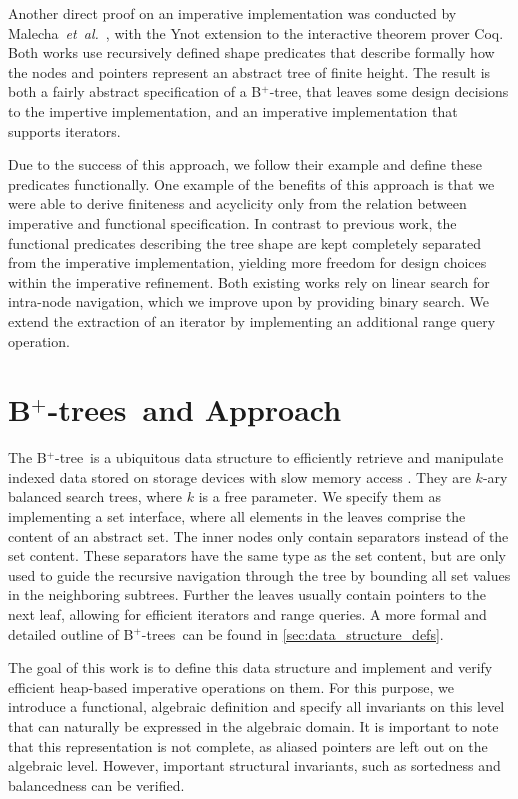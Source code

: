 \documentclass[a4paper,UKenglish,cleveref, cref, thm-restate]{lipics-v2021}
\newcommand{\btree}{B$^+$-tree}
\newcommand{\btrees}{B$^+$-trees}
\begin{document}
Another direct proof on an imperative implementation
was conducted by Malecha~\emph{et~al.}~\cite{DBLP:conf/popl/MalechaMSW10}, with the Ynot
extension to the interactive theorem prover Coq.
Both works use recursively defined shape predicates
that describe formally how the nodes and pointers
represent an abstract tree of finite height.
The result is both a fairly abstract specification of a \btree,
that leaves some design decisions to the impertive implementation,
and an imperative implementation that supports
iterators.

Due to the success of this approach,
we follow their example and define these predicates functionally.
One example of the benefits of this approach is that we were able
to derive finiteness and acyclicity only from the
relation between imperative and functional specification.
In contrast to previous work, the functional predicates describing the tree shape are kept
completely separated from the imperative implementation,
yielding more freedom for design choices within the imperative refinement.
Both existing works rely on linear search for intra-node navigation,
which we improve upon by providing binary search.
We extend the extraction of an iterator
by implementing an additional range query operation. 


\section{\btrees\ and Approach}
\label{sec:approach}


The \btree\ is a ubiquitous data structure to efficiently retrieve and manipulate
indexed data stored on storage devices with slow memory access \cite{DBLP:journals/csur/Comer79}.
They are $k$-ary balanced search trees, where $k$ is a free parameter.
We specify them as implementing a set interface,
where all elements in the leaves comprise the content of an abstract set.
The inner nodes only contain separators instead of the set content.
These separators have the same type as the set content,
but are only used to guide the recursive navigation through the tree
by bounding all set values in the neighboring subtrees.
Further the leaves usually contain pointers
to the next leaf, allowing for efficient iterators and range queries.
A more formal and detailed outline of \btrees\ can be found in \cref{sec:data_structure_defs}.

The goal of this work is to define this data structure
and implement and verify efficient heap-based imperative operations on them.
For this purpose, we introduce a functional, algebraic definition and
specify all invariants on this level that can naturally be expressed in the algebraic domain.
It is important to note that this representation is not complete,
as aliased pointers are left out on the algebraic level.
However, important structural invariants, such as sortedness and balancedness
can be verified.
\end{document}
